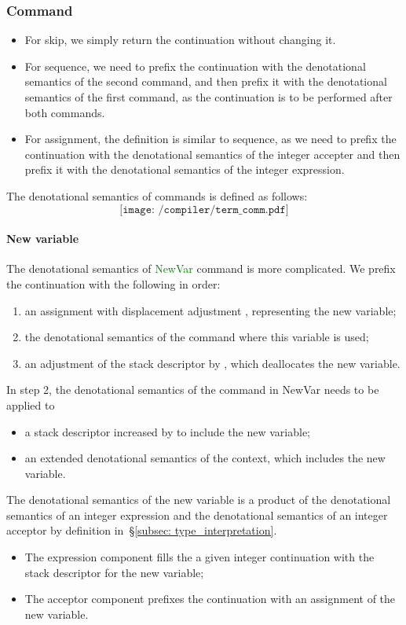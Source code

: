 \documentclass[12pt,a4paper]{report}
\theoremstyle{definition}
\newcommand{\secref}[1]{\S\ref{#1}}
\newcommand{\gn}[1]{\textcolor{green}{#1}}
\newcommand{\gnt}[1]{\gn{\textsf{#1}}}
\begin{document}
        \subsubsection{Command}
        \begin{itemize}
            \item For skip, we simply return the continuation \text{\kappa} without changing it.
            \item For sequence, we need to prefix the continuation with the denotational semantics of the second command, and then prefix it with the denotational semantics of the first command, as the continuation \text{\kappa} is to be performed after both commands.
            \item For assignment, the definition is similar to sequence, as we need to prefix the continuation with the denotational semantics of the integer accepter and then prefix it with the denotational semantics of the integer expression.
        \end{itemize}
        The denotational semantics of commands is defined as follows:
        \[\texttt{[image: /compiler/term\_comm.pdf]}\]

        \paragraph{New variable}
        The denotational semantics of \gnt{NewVar} command is more complicated. We prefix the continuation with the following in order:
        \begin{enumerate}
            \item an assignment with displacement adjustment , representing the new variable;
            \item the denotational semantics of the command where this variable is used;
            \item an adjustment of the stack descriptor by , which deallocates the new variable.
        \end{enumerate}
        In step 2, the denotational semantics of the command in \textsf{NewVar} needs to be applied to
        \begin{itemize}
            \item a stack descriptor increased by  to include the new variable;
            \item an extended denotational semantics of the context, which includes the new variable.
        \end{itemize}
        The denotational semantics of the new variable is a product of the denotational semantics of an integer expression and the denotational semantics of an integer acceptor by definition in~\secref{subsec: type_interpretation}.
        \begin{itemize}
            \item The expression component fills the a given integer continuation \text{\beta} with the stack descriptor for the new variable;
            \item The acceptor component prefixes the continuation \text{\kappa} with an assignment of the new variable.
        \end{itemize}
\end{document}
